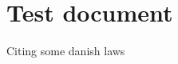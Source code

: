 \documentclass{article}
\begin{document}
\section{Test document}
Citing some danish laws \cite{barnetslov119stk2,straffeloven116stk2,lovomsocialservice188stk1,lovomretssikkerhedogadministrationpdetsocialeomrde12astk8,lovomrettenspleje126stk2,konkurrenceloven15astk2,forldreansvarsloven18stk1}


\printbibliography
\end{document}
